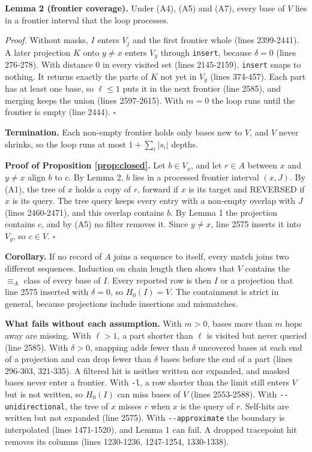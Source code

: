 \textbf{Lemma 2 (frontier coverage).}
Under (A4), (A5) and (A7), every base of $V$ lies in a frontier interval that the loop processes.

\emph{Proof.}
Without masks, $I$ enters $V_j$ and the first frontier whole (lines 2399-2441).
A later projection $K$ onto $y\neq x$ enters $V_y$ through \texttt{insert}, because $\delta=0$ (lines 276-278).
With distance 0 in every visited set (lines 2145-2159), \texttt{insert} snaps to nothing.
It returns exactly the parts of $K$ not yet in $V_y$ (lines 374-457).
Each part has at least one base, so $\ell\le 1$ puts it in the next frontier (line 2585), and merging keeps the union (lines 2597-2615).
With $m=0$ the loop runs until the frontier is empty (line 2444).
$\square$

\textbf{Termination.}
Each non-empty frontier holds only bases new to $V$, and $V$ never shrinks, so the loop runs at most $1+\sum_i|s_i|$ depths.

\textbf{Proof of Proposition \ref{prop:closed}.}
Let $b\in V_x$, and let $r\in A$ between $x$ and $y\neq x$ align $b$ to $c$.
By Lemma 2, $b$ lies in a processed frontier interval $(x,J)$.
By (A1), the tree of $x$ holds a copy of $r$, forward if $x$ is its target and REVERSED if $x$ is its query.
The tree query keeps every entry with a non-empty overlap with $J$ (lines 2460-2471), and this overlap contains $b$.
By Lemma 1 the projection contains $c$, and by (A5) no filter removes it.
Since $y\neq x$, line 2575 inserts it into $V_y$, so $c\in V$.
$\square$

\textbf{Corollary.}
If no record of $A$ joins a sequence to itself, every match joins two different sequences.
Induction on chain length then shows that $V$ contains the $\equiv_A$ class of every base of $I$.
Every reported row is then $I$ or a projection that line 2575 inserted with $\delta=0$, so $H_0(I)=V$.
The containment is strict in general, because projections include insertions and mismatches.

\textbf{What fails without each assumption.}
With $m>0$, bases more than $m$ hops away are missing.
With $\ell>1$, a part shorter than $\ell$ is visited but never queried (line 2585).
With $\delta>0$, snapping adds fewer than $\delta$ uncovered bases at each end of a projection and can drop fewer than $\delta$ bases before the end of a part (lines 296-303, 321-335).
A filtered hit is neither written nor expanded, and masked bases never enter a frontier.
With \texttt{-l}, a row shorter than the limit still enters $V$ but is not written, so $H_0(I)$ can miss bases of $V$ (lines 2553-2588).
With \texttt{-{}-unidirectional}, the tree of $x$ misses $r$ when $x$ is the query of $r$.
Self-hits are written but not expanded (line 2575).
With \texttt{-{}-approximate} the boundary is interpolated (lines 1471-1520), and Lemma 1 can fail.
A dropped tracepoint hit removes its columns (lines 1230-1236, 1247-1254, 1330-1338).

